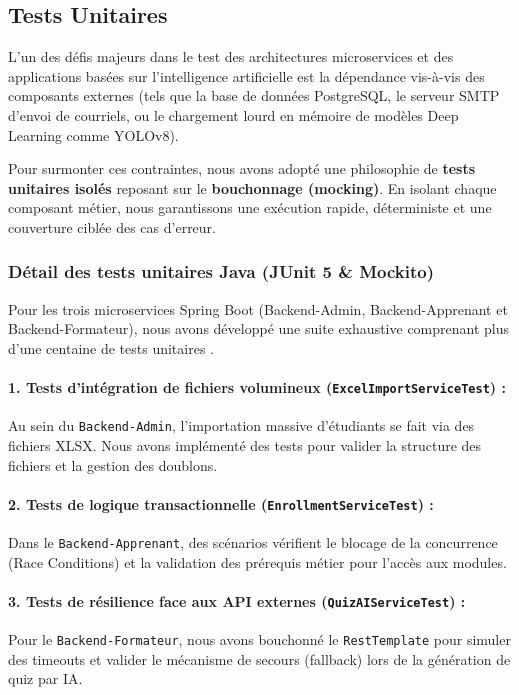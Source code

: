 \subsection{Tests Unitaires}
L'un des défis majeurs dans le test des architectures microservices et des applications basées sur l'intelligence artificielle est la dépendance vis-à-vis des composants externes (tels que la base de données PostgreSQL, le serveur SMTP d'envoi de courriels, ou le chargement lourd en mémoire de modèles Deep Learning comme YOLOv8).

Pour surmonter ces contraintes, nous avons adopté une philosophie de \textbf{tests unitaires isolés} reposant sur le \textbf{bouchonnage (mocking)}. En isolant chaque composant métier, nous garantissons une exécution rapide, déterministe et une couverture ciblée des cas d'erreur.

\subsubsection{Détail des tests unitaires Java (JUnit 5 \& Mockito)}
Pour les trois microservices Spring Boot (Backend-Admin, Backend-Apprenant et Backend-Formateur), nous avons développé une suite exhaustive comprenant plus d'une centaine de tests unitaires \cite{kleuker2019junit5}.

\paragraph{1. Tests d'intégration de fichiers volumineux (\texttt{ExcelImportServiceTest}) :}
Au sein du \texttt{Backend-Admin}, l'importation massive d'étudiants se fait via des fichiers XLSX. Nous avons implémenté des tests pour valider la structure des fichiers et la gestion des doublons.

\paragraph{2. Tests de logique transactionnelle (\texttt{EnrollmentServiceTest}) :}
Dans le \texttt{Backend-Apprenant}, des scénarios vérifient le blocage de la concurrence (Race Conditions) et la validation des prérequis métier pour l'accès aux modules.

\paragraph{3. Tests de résilience face aux API externes (\texttt{QuizAIServiceTest}) :}
Pour le \texttt{Backend-Formateur}, nous avons bouchonné le \texttt{RestTemplate} pour simuler des timeouts et valider le mécanisme de secours (fallback) lors de la génération de quiz par IA.

